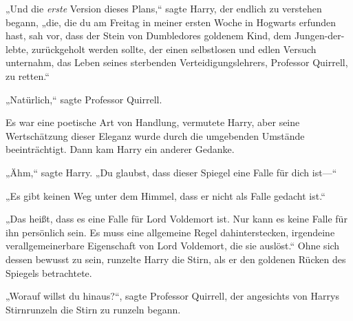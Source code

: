 „Und die \emph{erste} Version dieses Plans,“ sagte Harry, der endlich zu verstehen begann, „die, die du am Freitag in meiner ersten Woche in Hogwarts erfunden hast, sah vor, dass der Stein von Dumbledores goldenem Kind, dem Jungen-der-lebte, zurückgeholt werden sollte, der einen selbstlosen und edlen Versuch unternahm, das Leben seines sterbenden Verteidigungslehrers, Professor Quirrell, zu retten.“

„Natürlich,“ sagte Professor Quirrell.

Es war eine poetische Art von Handlung, vermutete Harry, aber seine Wertschätzung dieser Eleganz wurde durch die umgebenden Umstände beeinträchtigt.
Dann kam Harry ein anderer Gedanke.

„Ähm,“ sagte Harry. „Du glaubst, dass dieser Spiegel eine Falle für dich ist—“

„Es gibt keinen Weg unter dem Himmel, dass er nicht als Falle gedacht ist.“

„Das heißt, dass es eine Falle für Lord Voldemort ist. Nur kann es keine Falle für ihn persönlich sein. Es muss eine allgemeine Regel dahinterstecken, irgendeine verallgemeinerbare Eigenschaft von Lord Voldemort, die sie auslöst.“
Ohne sich dessen bewusst zu sein, runzelte Harry die Stirn, als er den goldenen Rücken des Spiegels betrachtete.

„Worauf willst du hinaus?“, sagte Professor Quirrell, der angesichts von Harrys Stirnrunzeln die Stirn zu runzeln begann.

